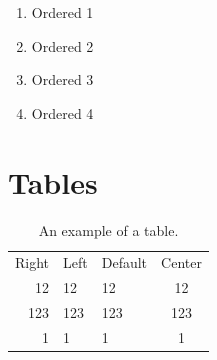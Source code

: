 \documentclass{article}
\begin{document}
\begin{enumerate}
\item Ordered 1
\item Ordered 2
\item Ordered 3
\item Ordered 4
\end{enumerate}

\section{Tables}

\begin{table}
	\centering
	\caption{An example of a table.}
	\begin{tabular}{ r l l c }
		Right & Left & Default & Center \\
		12 & 12 & 12 & 12 \\
		123 & 123 & 123 & 123 \\
		1 & 1 & 1 & 1 \\
	\end{tabular}
\end{table}
\end{document}
